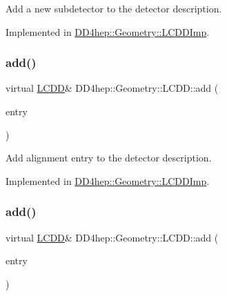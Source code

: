 Add a new subdetector to the detector description. 



Implemented in \hyperlink{class_d_d4hep_1_1_geometry_1_1_l_c_d_d_imp_a06e5ca9521c2527da58eded16edce69e}{D\+D4hep\+::\+Geometry\+::\+L\+C\+D\+D\+Imp}.

\hypertarget{class_d_d4hep_1_1_geometry_1_1_l_c_d_d_a338b46c3a01bcd48b9c9f8ad74501c1d}{}\label{class_d_d4hep_1_1_geometry_1_1_l_c_d_d_a338b46c3a01bcd48b9c9f8ad74501c1d} 
\subsubsection{\texorpdfstring{add()}{add()}\hspace{0.1cm}{\footnotesize\ttfamily [9/10]}}
{\footnotesize\ttfamily virtual \hyperlink{class_d_d4hep_1_1_geometry_1_1_l_c_d_d}{L\+C\+DD}\& D\+D4hep\+::\+Geometry\+::\+L\+C\+D\+D\+::add (\begin{DoxyParamCaption}\item[{\hyperlink{class_d_d4hep_1_1_geometry_1_1_alignment_entry}{Alignment\+Entry}}]{entry }\end{DoxyParamCaption})\hspace{0.3cm}{\ttfamily [pure virtual]}}



Add alignment entry to the detector description. 



Implemented in \hyperlink{class_d_d4hep_1_1_geometry_1_1_l_c_d_d_imp_a8322896ad0d803ecb38fd3ccd3cdb989}{D\+D4hep\+::\+Geometry\+::\+L\+C\+D\+D\+Imp}.

\hypertarget{class_d_d4hep_1_1_geometry_1_1_l_c_d_d_a57833b868c0abeb0d1ee43d1895a5996}{}\label{class_d_d4hep_1_1_geometry_1_1_l_c_d_d_a57833b868c0abeb0d1ee43d1895a5996} 
\subsubsection{\texorpdfstring{add()}{add()}\hspace{0.1cm}{\footnotesize\ttfamily [10/10]}}
{\footnotesize\ttfamily virtual \hyperlink{class_d_d4hep_1_1_geometry_1_1_l_c_d_d}{L\+C\+DD}\& D\+D4hep\+::\+Geometry\+::\+L\+C\+D\+D\+::add (\begin{DoxyParamCaption}\item[{\hyperlink{class_d_d4hep_1_1_geometry_1_1_cartesian_field}{Cartesian\+Field}}]{entry }\end{DoxyParamCaption})\hspace{0.3cm}{\ttfamily [pure virtual]}}



